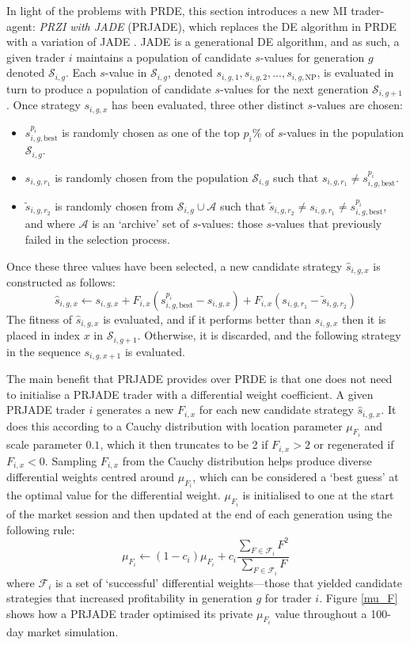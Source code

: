 \documentclass[a4paper,twoside]{article}
\begin{document}
In light of the problems with PRDE, this section introduces a new MI trader-agent: \textit{PRZI with JADE} (PRJADE), which replaces the DE algorithm in PRDE with a variation of JADE \cite{ZhangSanderson}.
JADE is a generational DE algorithm, and as such, a given trader $i$ maintains a population of candidate $s$-values for generation $g$ denoted $\mathcal{S}_{i,g}$.
Each $s$-value in $\mathcal{S}_{i,g}$, denoted $s_{i,g,1}, s_{i,g,2}, ..., s_{i,g,\mathrm{NP}}$, is evaluated in turn to produce a population of candidate $s$-values for the next generation $\mathcal{S}_{i,g+1}$.
Once strategy $s_{i,g,x}$ has been evaluated, three other distinct $s$-values are chosen:
\begin{itemize}
    \item $s^{p_i}_{i,g,\text{best}}$ is randomly chosen as one of the top $p_i\%$ of $s$-values in the population $\mathcal{S}_{i,g}$.
    \item $s_{i,g,r_1}$ is randomly chosen from the population $\mathcal{S}_{i,g}$ such that $s_{i,g,r_1}\ne s^{p_i}_{i,g,\text{best}}$.
    \item $\tilde{s}_{i,g,r_2}$ is randomly chosen from $\mathcal{S}_{i,g}\cup\mathcal{A}$ such that $\tilde{s}_{i,g,r_2}\ne s_{i,g,r_1}\ne s^{p_i}_{i,g,\text{best}}$, and where $\mathcal{A}$ is an `archive' set of $s$-values: those $s$-values that previously failed in the selection process.
\end{itemize}

Once these three values have been selected, a new candidate strategy $\hat{s}_{i,g,x}$ is constructed as follows:
\[
    \hat{s}_{i,g,x}\leftarrow s_{i,g,x}+F_{i,x}\left(s^{p_i}_{i,g,\text{best}} - s_{i,g,x}\right) + F_{i,x}\left(s_{i,g,r_1} - \tilde{s}_{i,g,r_2}\right)
\]
The fitness of $\hat{s}_{i,g,x}$ is evaluated, and if it performs better than $s_{i,g,x}$ then it is placed in index $x$ in $\mathcal{S}_{i,g+1}$. 
Otherwise, it is discarded, and the following strategy in the sequence $s_{i,g,x+1}$ is evaluated.

The main benefit that PRJADE provides over PRDE is that one does not need to initialise a PRJADE trader with a differential weight coefficient.
A given PRJADE trader $i$ generates a new $F_{i,x}$ for each new candidate strategy $\hat{s}_{i,g,x}$.
It does this according to a Cauchy distribution with location parameter $\mu_{F_i}$ and scale parameter $0.1$, which it then truncates to be 2 if $F_{i,x}>2$ or regenerated if $F_{i,x}<0$.
Sampling $F_{i,x}$ from the Cauchy distribution helps produce diverse differential weights centred around $\mu_{F_i}$, which can be considered a `best guess' at the optimal value for the differential weight.
$\mu_{F_i}$ is initialised to one at the start of the market session and then updated at the end of each generation using the following rule:
\[
    \mu_{F_i}\leftarrow (1-c_i)\mu_{F_i} + c_i\frac{\sum_{F\in \mathcal{F}_i} F^2}{\sum_{F\in\mathcal{F}_i} F}
\]
where $\mathcal{F}_i$ is a set of `successful' differential weights---those that yielded candidate strategies that increased profitability in generation $g$ for trader $i$.
Figure \ref{mu_F} shows how a PRJADE trader optimised its private $\mu_{F_i}$ value throughout a 100-day market simulation.
\end{document}
